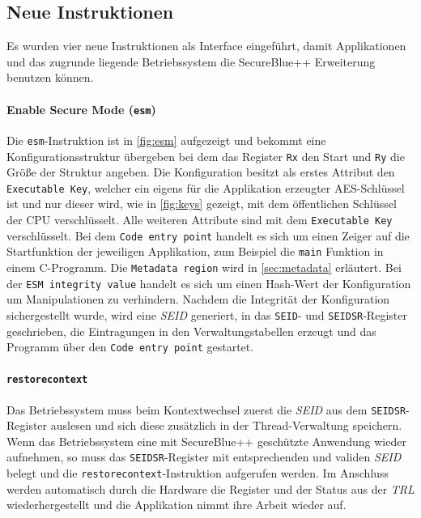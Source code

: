 \documentclass[ngerman]{sig-alternate-05-2015}
\begin{document}
\subsection{Neue Instruktionen}
\label{sec:instruktionen}
Es wurden vier neue Instruktionen als Interface eingeführt, damit Applikationen und das zugrunde liegende Betriebssystem die SecureBlue++ Erweiterung benutzen können.
\paragraph{Enable Secure Mode (\texttt{esm})}
\label{sec:esm}
Die \texttt{esm}-Instruktion ist in \cref{fig:esm} aufgezeigt und bekommt eine Konfigurationsstruktur übergeben bei dem das Register \texttt{Rx} den Start und \texttt{Ry} die Größe der Struktur angeben. Die Konfiguration besitzt als erstes Attribut den \texttt{Executable Key}, welcher ein eigens für die Applikation erzeugter AES-Schlüssel ist und nur dieser wird, wie in \cref{fig:keys} gezeigt, mit dem öffentlichen Schlüssel der CPU verschlüsselt. Alle weiteren Attribute sind mit dem \texttt{Executable Key} verschlüsselt. Bei dem \texttt{Code entry point} handelt es sich um einen Zeiger auf die Startfunktion der jeweiligen Applikation, zum Beispiel die \verb|main| Funktion in einem C-Programm. Die \texttt{Metadata region} wird in \cref{sec:metadata} erläutert. Bei der \texttt{ESM integrity value} handelt es sich um einen Hash-Wert der Konfiguration um Manipulationen zu verhindern. Nachdem die Integrität der Konfiguration sichergestellt wurde, wird eine \emph{SEID} generiert, in das \texttt{SEID}- und \texttt{SEIDSR}-Register geschrieben, die Eintragungen in den Verwaltungstabellen erzeugt und das Programm über den \texttt{Code entry point} gestartet.

\paragraph{\texttt{restorecontext}}
Das Betriebssystem muss beim Kontextwechsel zuerst die \emph{SEID} aus dem \texttt{SEIDSR}-Register auslesen und sich diese zusätzlich in der Thread-Verwaltung speichern. Wenn das Betriebssystem eine mit SecureBlue++ geschützte Anwendung wieder aufnehmen, so muss das \texttt{SEIDSR}-Register mit entsprechenden und validen \emph{SEID} belegt und die \texttt{restorecontext}-Instruktion aufgerufen werden. Im Anschluss werden automatisch durch die Hardware die Register und der Status aus der \emph{TRL} wiederhergestellt und die Applikation nimmt ihre Arbeit wieder auf.
\end{document}
